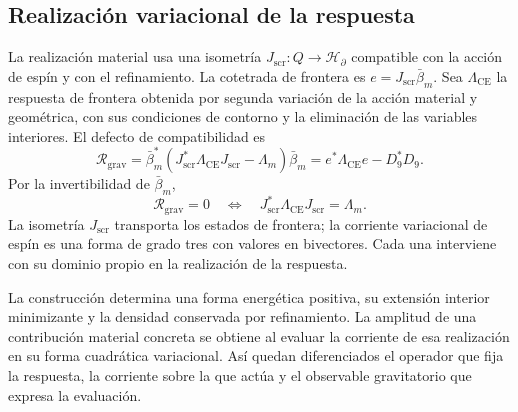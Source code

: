 \subsection{Realización variacional de la respuesta}
\label{vii:sec:realizacion-respuesta}

La realización material usa una isometría
\(J_{\mathrm{scr}}:Q\longrightarrow\mathcal H_\partial\)
compatible con la acción de espín y con el refinamiento.
La cotetrada de frontera es \(e=J_{\mathrm{scr}}\bar\beta_m\).
Sea \(\Lambda_{\mathrm{CE}}\) la respuesta de frontera obtenida
por segunda variación de la acción material y geométrica, con sus
condiciones de contorno y la eliminación de las variables interiores.
El defecto de compatibilidad es
\begin{equation}
 \mathcal R_{\mathrm{grav}}
 =\bar\beta_m^*
   (J_{\mathrm{scr}}^*\Lambda_{\mathrm{CE}}J_{\mathrm{scr}}-\Lambda_m)
   \bar\beta_m
 =e^*\Lambda_{\mathrm{CE}}e-D_9^*D_9.
 \label{vii:eq:defecto-respuesta}
\end{equation}
Por la invertibilidad de \(\bar\beta_m\),
\[
 \mathcal R_{\mathrm{grav}}=0
 \quad\Longleftrightarrow\quad
 J_{\mathrm{scr}}^*\Lambda_{\mathrm{CE}}J_{\mathrm{scr}}=\Lambda_m.
\]
La isometría \(J_{\mathrm{scr}}\) transporta los estados de frontera;
la corriente variacional de espín es una forma de grado tres con valores
en bivectores. Cada una interviene con su dominio propio en la
realización de la respuesta.

La construcción determina una forma energética positiva, su extensión
interior minimizante y la densidad conservada por refinamiento.
La amplitud de una contribución material concreta se obtiene al evaluar
la corriente de esa realización en su forma cuadrática variacional.
Así quedan diferenciados el operador que fija la respuesta, la corriente
sobre la que actúa y el observable gravitatorio que expresa la evaluación.
